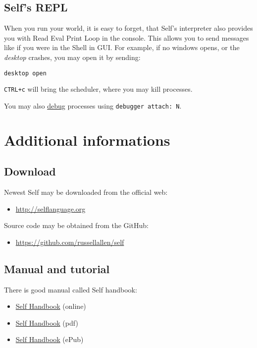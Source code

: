 \documentclass[10pt]{article}
\begin{document}
\begin{multicols*}{3}
\subsection{Self's REPL}
When you run your world, it is easy to forget, that Self's interpreter also provides you with Read Eval Print Loop in the console. This allows you to send messages like if you were in the Shell in GUI. For example, if no windows opens, or the \textit{desktop} crashes, you may open it by sending:

\begin{lstlisting}
desktop open
\end{lstlisting}

\texttt{CTRL+c} will bring the scheduler, where you may kill processes.

You may also \href{http://handbook.selflanguage.org/4.5/textdebug.html}{debug} processes using \texttt{debugger\ attach:\ N}.




\vfill
\columnbreak
\section{Additional informations}
\subsection{Download}
Newest Self may be downloaded from the official web:

\begin{itemize}[noitemsep]
\item \url{http://selflanguage.org}
\end{itemize}

Source code may be obtained from the GitHub:

\begin{itemize}[noitemsep]
\item \url{https://github.com/russellallen/self}
\end{itemize}



\subsection{Manual and tutorial}
There is good manual called Self handbook:

\begin{itemize}[noitemsep]
\item \href{http://handbook.selflanguage.org/4.5/}{Self Handbook} (online)
\item \href{https://dl.dropboxusercontent.com/u/11891854/tmp/ebooks/Self/SelfHandbook.pdf}{Self Handbook} (pdf)
\item \href{https://dl.dropboxusercontent.com/u/11891854/tmp/ebooks/Self/SelfHandbook.epub}{Self Handbook} (ePub)
\end{itemize}


\end{multicols*}
\end{document}
